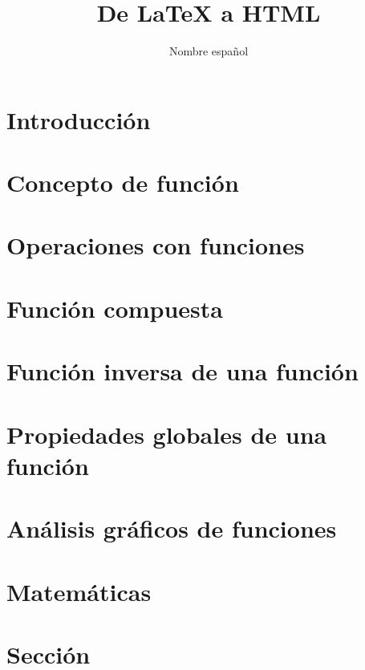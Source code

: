 \documentclass[12pt,a4paper,twoside]{article}
\title{De LaTeX a HTML}
\author{Nombre español}
\begin{document}
\maketitle

\tableofcontents



\section{Introducción}


\section{Concepto de función}


\section{Operaciones con funciones}


\section{Función compuesta}


\section{Función inversa de una función}


\section{Propiedades globales de una función}


\section{Análisis gráficos de funciones}


\section{Matemáticas}




\section{Sección}
\end{document}
